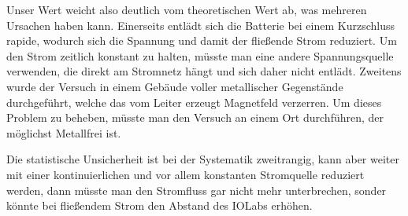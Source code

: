 Unser Wert weicht also deutlich vom theoretischen Wert ab, was mehreren Ursachen haben kann. Einerseits entlädt sich die Batterie bei einem Kurzschluss rapide, wodurch sich die Spannung und damit der fließende Strom reduziert. Um den Strom zeitlich konstant zu halten, müsste man eine andere Spannungsquelle verwenden, die direkt am Stromnetz hängt und sich daher nicht entlädt. Zweitens wurde der Versuch in einem Gebäude voller metallischer Gegenstände durchgeführt, welche das vom Leiter erzeugt Magnetfeld verzerren. Um dieses Problem zu beheben, müsste man den Versuch an einem Ort durchführen, der möglichst Metallfrei ist.

Die statistische Unsicherheit ist bei der Systematik zweitrangig, kann aber weiter mit einer kontinuierlichen und vor allem konstanten Stromquelle reduziert werden, dann müsste man den Stromfluss gar nicht mehr unterbrechen, sonder könnte bei fließendem Strom den Abstand des IOLabs erhöhen.
